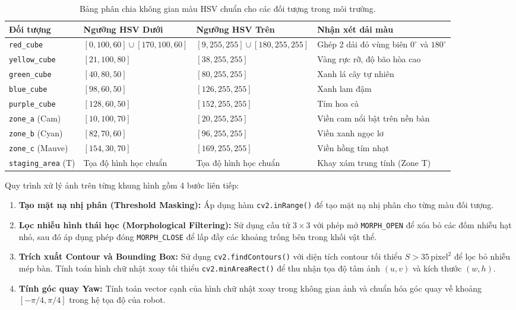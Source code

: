 \documentclass[a4paper,12pt]{article}
\begin{document}
\begin{table}[H]\centering
\small
\begin{tabular}{p{2.6cm}p{3.5cm}p{3.5cm}p{3.8cm}}
\toprule
Đối tượng & Ngưỡng HSV Dưới & Ngưỡng HSV Trên & Nhận xét dải màu\\
\midrule
\texttt{red\_cube} & $[0, 100, 60] \cup [170, 100, 60]$ & $[9, 255, 255] \cup [180, 255, 255]$ & Ghép 2 dải đỏ vùng biên $0^\circ$ và $180^\circ$\\
\texttt{yellow\_cube} & $[21, 100, 80]$ & $[38, 255, 255]$ & Vàng rực rỡ, độ bão hòa cao\\
\texttt{green\_cube} & $[40, 80, 50]$ & $[80, 255, 255]$ & Xanh lá cây tự nhiên\\
\texttt{blue\_cube} & $[98, 60, 50]$ & $[126, 255, 255]$ & Xanh lam đậm\\
\texttt{purple\_cube} & $[128, 60, 50]$ & $[152, 255, 255]$ & Tím hoa cà\\
\texttt{zone\_a} (Cam) & $[10, 100, 70]$ & $[20, 255, 255]$ & Viền cam nổi bật trên nền bàn\\
\texttt{zone\_b} (Cyan) & $[82, 70, 60]$ & $[96, 255, 255]$ & Viền xanh ngọc lơ\\
\texttt{zone\_c} (Mauve) & $[154, 30, 70]$ & $[169, 255, 255]$ & Viền hồng tím nhạt\\
\texttt{staging\_area} (T) & Tọa độ hình học chuẩn & Tọa độ hình học chuẩn & Khay xám trung tính (Zone T)\\
\bottomrule
\end{tabular}
\caption{Bảng phân chia không gian màu HSV chuẩn cho các đối tượng trong môi trường.}
\end{table}

Quy trình xử lý ảnh trên từng khung hình gồm 4 bước liên tiếp:
\begin{enumerate}
    \item \textbf{Tạo mặt nạ nhị phân (Threshold Masking):} Áp dụng hàm \texttt{cv2.inRange()} để tạo mặt nạ nhị phân cho từng màu đối tượng.
    \item \textbf{Lọc nhiễu hình thái học (Morphological Filtering):} Sử dụng cấu tử $3\times 3$ với phép mở \texttt{MORPH\_OPEN} để xóa bỏ các đốm nhiễu hạt nhỏ, sau đó áp dụng phép đóng \texttt{MORPH\_CLOSE} để lấp đầy các khoảng trống bên trong khối vật thể.
    \item \textbf{Trích xuất Contour và Bounding Box:} Sử dụng \texttt{cv2.findContours()} với diện tích contour tối thiểu $S > 35\,\text{pixel}^2$ để lọc bỏ nhiễu mép bàn. Tính toán hình chữ nhật xoay tối thiểu \texttt{cv2.minAreaRect()} để thu nhận tọa độ tâm ảnh $(u, v)$ và kích thước $(w, h)$.
    \item \textbf{Tính góc quay Yaw:} Tính toán vector cạnh của hình chữ nhật xoay trong không gian ảnh và chuẩn hóa góc quay về khoảng $[-\pi/4, \pi/4]$ trong hệ tọa độ của robot.
\end{enumerate}
\end{document}
